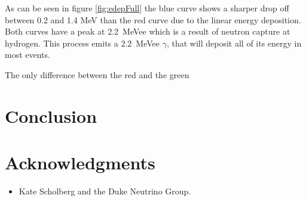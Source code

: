 \documentclass[12pt]{article}
\begin{document}
 As can be seen in figure \ref{fig:edepFull} the blue curve shows a sharper drop off between 0.2 and 1.4 MeV than the red curve due to the linear energy deposition. Both curves have a peak at \SI{2.2}{MeVee} which is a result of neutron capture at hydrogen. This process emits a \SI{2.2}{MeVee} $\gamma$, that will deposit all of its energy in most events.
 
The only difference between the red and the green
 
\section{Conclusion}


\section*{Acknowledgments}
\begin{itemize}
  \item[] Kate Scholberg and the Duke Neutrino Group.
\end{itemize}



\end{document}
